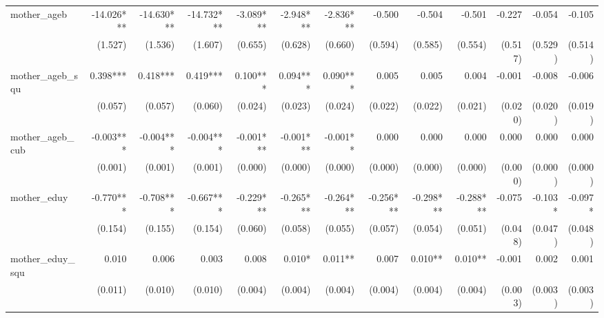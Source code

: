 \begin{tabular}{lrrrrrrrrrrrr}
mother\_ageb                                &   -14.026*** &   -14.630*** &   -14.732*** &    -3.089*** &    -2.948*** &    -2.836*** &       -0.500 &       -0.504 &       -0.501 &       -0.227 &       -0.054 &       -0.105 \\ 
                                            &      (1.527) &      (1.536) &      (1.607) &      (0.655) &      (0.628) &      (0.660) &      (0.594) &      (0.585) &      (0.554) &      (0.517) &      (0.529) &      (0.514) \\ 
mother\_ageb\_squ                           &     0.398*** &     0.418*** &     0.419*** &     0.100*** &     0.094*** &     0.090*** &        0.005 &        0.005 &        0.004 &       -0.001 &       -0.008 &       -0.006 \\ 
                                            &      (0.057) &      (0.057) &      (0.060) &      (0.024) &      (0.023) &      (0.024) &      (0.022) &      (0.022) &      (0.021) &      (0.020) &      (0.020) &      (0.019) \\ 
mother\_ageb\_cub                           &    -0.003*** &    -0.004*** &    -0.004*** &    -0.001*** &    -0.001*** &     -0.001** &        0.000 &        0.000 &        0.000 &        0.000 &        0.000 &        0.000 \\ 
                                            &      (0.001) &      (0.001) &      (0.001) &      (0.000) &      (0.000) &      (0.000) &      (0.000) &      (0.000) &      (0.000) &      (0.000) &      (0.000) &      (0.000) \\ 
mother\_eduy                                &    -0.770*** &    -0.708*** &    -0.667*** &    -0.229*** &    -0.265*** &    -0.264*** &    -0.256*** &    -0.298*** &    -0.288*** &       -0.075 &      -0.103* &      -0.097* \\ 
                                            &      (0.154) &      (0.155) &      (0.154) &      (0.060) &      (0.058) &      (0.055) &      (0.057) &      (0.054) &      (0.051) &      (0.048) &      (0.047) &      (0.048) \\ 
mother\_eduy\_squ                           &        0.010 &        0.006 &        0.003 &        0.008 &       0.010* &      0.011** &        0.007 &      0.010** &      0.010** &       -0.001 &        0.002 &        0.001 \\ 
                                            &      (0.011) &      (0.010) &      (0.010) &      (0.004) &      (0.004) &      (0.004) &      (0.004) &      (0.004) &      (0.004) &      (0.003) &      (0.003) &      (0.003) \\ 

\end{tabular}
